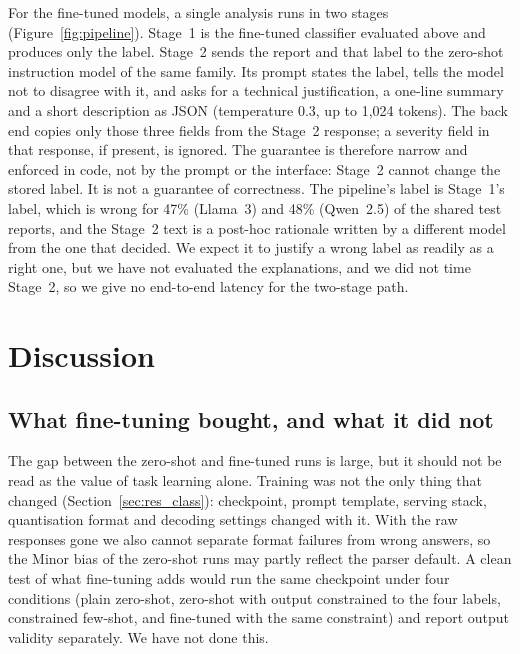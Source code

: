 \documentclass[a4paper,fleqn]{cas-sc}
\begin{document}
For the fine-tuned models, a single analysis runs in two stages (Figure~\ref{fig:pipeline}).
Stage~1 is the fine-tuned classifier evaluated above and produces only the label. Stage~2
sends the report and that label to the zero-shot instruction model of the same family.
Its prompt states the label, tells the model not to disagree with it, and asks for a
technical justification, a one-line summary and a short description as JSON
(temperature 0.3, up to 1,024 tokens). The back end copies only those three fields from
the Stage~2 response; a severity field in that response, if present, is ignored. The
guarantee is therefore narrow and enforced in code, not by the prompt or the interface:
Stage~2 cannot change the stored label. It is not a guarantee of correctness. The
pipeline's label is Stage~1's label, which is wrong for 47\% (Llama~3) and 48\%
(Qwen~2.5) of the shared test reports, and the Stage~2 text is a post-hoc rationale
written by a different model from the one that decided. We expect it to justify a wrong
label as readily as a right one, but we have not evaluated the explanations, and we did
not time Stage~2, so we give no end-to-end latency for the two-stage path.

\section{Discussion}
\label{sec:discussion}

\subsection{What fine-tuning bought, and what it did not}
\label{sec:disc_ft}

The gap between the zero-shot and fine-tuned runs is large, but it should not be read
as the value of task learning alone. Training was not the only thing that changed
(Section~\ref{sec:res_class}): checkpoint, prompt template, serving stack, quantisation
format and decoding settings changed with it. With the raw responses gone we also
cannot separate format failures from wrong answers, so the Minor bias of the zero-shot
runs may partly reflect the parser default. A clean test of what fine-tuning adds would
run the same checkpoint under four conditions (plain zero-shot, zero-shot with output
constrained to the four labels, constrained few-shot, and fine-tuned with the same
constraint) and report output validity separately. We have not done this.
\end{document}
